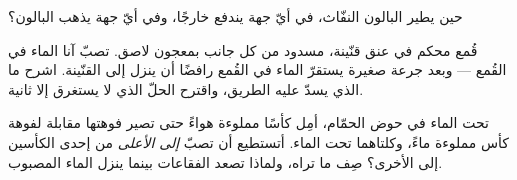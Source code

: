 \begin{exercise}[$\star$]\label{exo:g2:air-around-us:8}
حين يطير البالون النفّاث، في أيّ جهة يندفع  خارجًا، وفي
أيّ جهة يذهب البالون؟
\end{exercise}

\begin{exercise}[$\star\star$]\label{exo:g2:air-around-us:9}
قُمع محكم في عنق قنّينة، مسدود من كل جانب بمعجون لاصق. تصبّ آنا
الماء في القُمع --- وبعد جرعة صغيرة يستقرّ الماء في القُمع
رافضًا أن ينزل إلى القنّينة. اشرح ما الذي يسدّ عليه الطريق،
واقترح الحلّ الذي لا يستغرق إلا ثانية.
\end{exercise}

\begin{exercise}[$\star\star$]\label{exo:g2:air-around-us:10}
تحت الماء في حوض الحمّام، أمِل كأسًا مملوءة هواءً حتى تصير فوهتها
مقابلة لفوهة كأس مملوءة ماءً، وكلتاهما تحت الماء. أتستطيع أن
تصبّ  \emph{إلى الأعلى} من إحدى الكأسين إلى الأخرى؟ صِف
ما تراه، ولماذا تصعد الفقاعات بينما ينزل الماء المصبوب.
\end{exercise}
